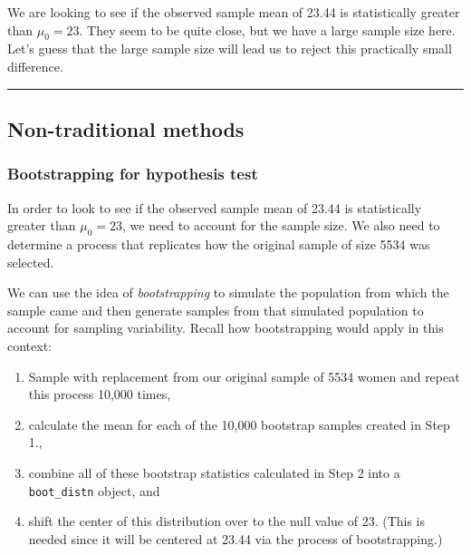 \documentclass[12pt,]{krantz}
\providecommand{\tightlist}{%
  \setlength{\itemsep}{0pt}\setlength{\parskip}{0pt}}
\begin{document}
We are looking to see if the observed sample mean of 23.44 is
statistically greater than \(\mu_0 = 23\). They seem to be quite close,
but we have a large sample size here. Let's guess that the large sample
size will lead us to reject this practically small difference.

\begin{center}\rule{0.5\linewidth}{\linethickness}\end{center}

\subsection{Non-traditional methods}\label{non-traditional-methods}

\subsubsection*{Bootstrapping for hypothesis
test}\label{bootstrapping-for-hypothesis-test}


In order to look to see if the observed sample mean of 23.44 is
statistically greater than \(\mu_0 = 23\), we need to account for the
sample size. We also need to determine a process that replicates how the
original sample of size 5534 was selected.

We can use the idea of \emph{bootstrapping} to simulate the population
from which the sample came and then generate samples from that simulated
population to account for sampling variability. Recall how bootstrapping
would apply in this context:

\begin{enumerate}
\def\labelenumi{\arabic{enumi}.}
\tightlist
\item
  Sample with replacement from our original sample of 5534 women and
  repeat this process 10,000 times,
\item
  calculate the mean for each of the 10,000 bootstrap samples created in
  Step 1.,
\item
  combine all of these bootstrap statistics calculated in Step 2 into a
  \texttt{boot\_distn} object, and
\item
  shift the center of this distribution over to the null value of 23.
  (This is needed since it will be centered at 23.44 via the process of
  bootstrapping.)
\end{enumerate}
\end{document}
